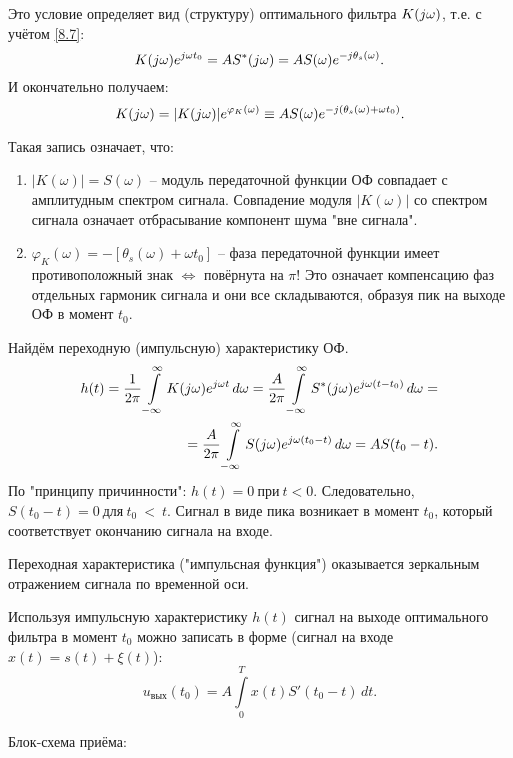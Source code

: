 \documentclass[../main/main.tex]{subfiles}
\begin{document}
Это условие определяет вид (структуру) оптимального фильтра $K(j\omega)$, т.е. с учётом \ref{8.7}: $$K(j\omega) e^{j\omega t_0} = A S^*(j\omega) = A S(\omega) e^{-j\theta_s(\omega)}.$$
И окончательно получаем: 
\begin{equation}
K(j\omega) = |K(j\omega)| e^{\varphi_K(\omega)} \equiv A S(\omega) e^{-j(\theta_s(\omega) + \omega t_0)}.
\end{equation}

Такая запись означает, что:
\begin{enumerate}
    \item $|K(\omega)| = S(\omega)$ -- модуль передаточной функции ОФ совпадает с амплитудным спектром сигнала. Совпадение модуля $|K(\omega)|$ со спектром сигнала означает отбрасывание компонент шума "вне сигнала".
    
    \item $\varphi_K(\omega) = -[\theta_s(\omega) + \omega t_0]$ -- фаза передаточной функции имеет противоположный знак $\Longleftrightarrow$ повёрнута на $\pi$! Это означает компенсацию фаз отдельных гармоник сигнала и они все складываются, образуя пик на выходе ОФ в момент $t_0$.
\end{enumerate}

Найдём переходную (импульсную) характеристику ОФ. 
\begin{equation}
\begin{split}
    h(t) = \frac{1}{2\pi} \displaystyle \int\limits_{-\infty}^{\infty} K(j\omega) e^{j\omega t} \, d\omega = \frac{A}{2\pi} \displaystyle \int\limits_{-\infty}^{\infty} S^*(j\omega) e^{j\omega (t-t_0)} \, d\omega = \\ = \frac{A}{2\pi} \displaystyle \int\limits_{-\infty}^{\infty} S(j\omega) e^{j\omega (t_0-t)} \, d\omega = A S(t_0-t).
\end{split}
\end{equation} 
По "принципу причинности"{}: $h(t) = 0~\text{при}~t<0$. Следовательно, $S(t_0 - t) = 0~\text{для}~t_0~<~t$. Сигнал в виде пика возникает в момент $t_0$, который соответствует окончанию сигнала на входе.

Переходная характеристика ("импульсная функция") оказывается зеркальным отражением сигнала по временной оси.

Используя импульсную характеристику $h(t)$ сигнал на выходе оптимального фильтра в момент $t_0$ можно записать в форме (сигнал на входе $x(t) = s(t) + \xi(t)$):
\begin{equation}
    u_{\text{вых}} (t_0) = A \int\limits_0^T x(t) S'(t_0 -t)\, dt.
\end{equation}

Блок-схема приёма: 
\end{document}
